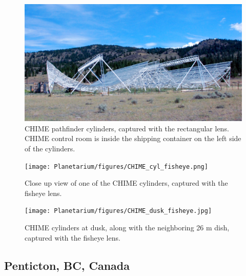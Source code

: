 \begin{figure}[htb]
\begin{center}
\includegraphics[width=0.95\linewidth]{Planetarium/figures/CHIME_cylinders.jpg}
\caption{CHIME pathfinder cylinders, captured with the rectangular lens. CHIME control room is inside the shipping container on the left side of the cylinders.}
\label{Fig:CHIME_cyl}
\end{center}
\end{figure}

\begin{figure}[htb]
\centering
\begin{minipage}[b]{0.54\textwidth}
\centering
\texttt{[image: Planetarium/figures/CHIME\_cyl\_fisheye.png]}
\caption{Close up view of one of the CHIME cylinders, captured with the fisheye lens.}
\label{Fig:CHIME_cyl_fisheye}
\end{minipage}%
\begin{minipage}[b]{0.02\textwidth}
\hspace{1cm}
\end{minipage}%
\begin{minipage}[b]{0.42\textwidth}
\centering
\texttt{[image: Planetarium/figures/CHIME\_dusk\_fisheye.jpg]}
\caption{CHIME cylinders at dusk, along with the neighboring 26 m dish, captured with the fisheye lens.}
\label{Fig:CHIME_dusk_fisheye}
\end{minipage}
\end{figure}


\subsection{Penticton, BC, Canada}

